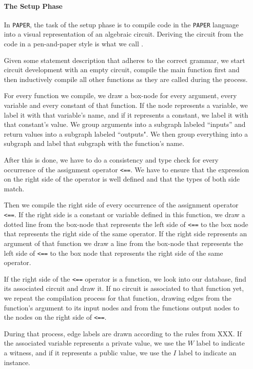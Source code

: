 \paragraph{The Setup Phase} In \texttt{PAPER}, the task of the setup phase is to compile code in the \texttt{PAPER} language into a visual representation of an algebraic circuit. Deriving the circuit from the code in a pen-and-paper style is what we call .

Given some statement description that adheres to the correct grammar, we start circuit development with an empty circuit, compile the main function first and then inductively compile all other functions as they are called during the process. 

For every function we compile, we draw a box-node for every argument, every variable and every constant of that function. If the node represents a variable, we label it with that variable's name, and if it represents a constant, we label it with that constant's value. We group arguments into a subgraph labeled ``inputs'' and return values into a subgraph labeled ``outputs". We then group everything into a subgraph and label that subgraph with the function's name.

After this is done, we have to do a consistency and type check for every occurrence of the assignment operator \texttt{<==}. We have to ensure that the expression on the right side of the operator is well defined and that the types of both side match.

Then we compile the right side of every occurrence of the assignment operator \texttt{<==}. If the right side is a constant or variable defined in this function, we draw a dotted line from the box-node that represents the left side of \texttt{<==} to the box node that represents the right side of the same operator. If the right side represents an argument of that function we draw a line from the box-node that represents the left side of \texttt{<==} to the box node that represents the right side of the same operator. 

If the right side of the \texttt{<==} operator is a function, we look into our database, find its associated circuit and draw it. If no circuit is  associated to that function yet, we repeat the compilation process for that function, drawing edges from the function's argument to its input nodes and from the functions output nodes to the nodes on the right side of \texttt{<==}.

During that process, edge labels are drawn according to the rules from XXX. If the associated variable represents a private value, we use the $W$ label to indicate a witness, and if it represents a public value, we use the $I$ label to indicate an instance.

